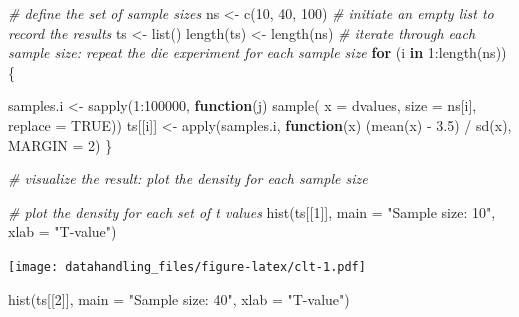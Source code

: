 \documentclass[
  12pt,
]{style/krantz}
\newenvironment{Shaded}{\begin{snugshade}}{\end{snugshade}}
\newcommand{\AttributeTok}[1]{\textcolor[rgb]{0.77,0.63,0.00}{#1}}
\newcommand{\CommentTok}[1]{\textcolor[rgb]{0.56,0.35,0.01}{\textit{#1}}}
\newcommand{\ConstantTok}[1]{\textcolor[rgb]{0.00,0.00,0.00}{#1}}
\newcommand{\ControlFlowTok}[1]{\textcolor[rgb]{0.13,0.29,0.53}{\textbf{#1}}}
\newcommand{\DecValTok}[1]{\textcolor[rgb]{0.00,0.00,0.81}{#1}}
\newcommand{\FloatTok}[1]{\textcolor[rgb]{0.00,0.00,0.81}{#1}}
\newcommand{\FunctionTok}[1]{\textcolor[rgb]{0.00,0.00,0.00}{#1}}
\newcommand{\NormalTok}[1]{#1}
\newcommand{\OtherTok}[1]{\textcolor[rgb]{0.56,0.35,0.01}{#1}}
\newcommand{\SpecialCharTok}[1]{\textcolor[rgb]{0.00,0.00,0.00}{#1}}
\newcommand{\StringTok}[1]{\textcolor[rgb]{0.31,0.60,0.02}{#1}}
\begin{document}
\begin{Shaded}
\begin{Highlighting}[]
\CommentTok{\# define the set of sample sizes}
\NormalTok{ns }\OtherTok{\textless{}{-}} \FunctionTok{c}\NormalTok{(}\DecValTok{10}\NormalTok{, }\DecValTok{40}\NormalTok{, }\DecValTok{100}\NormalTok{)}
\CommentTok{\# initiate an empty list to record the results}
\NormalTok{ts }\OtherTok{\textless{}{-}} \FunctionTok{list}\NormalTok{()}
\FunctionTok{length}\NormalTok{(ts) }\OtherTok{\textless{}{-}} \FunctionTok{length}\NormalTok{(ns)}
\CommentTok{\# iterate through each sample size: \textquotesingle{}repeat the die experiment for each sample size\textquotesingle{}}
\ControlFlowTok{for}\NormalTok{ (i }\ControlFlowTok{in} \DecValTok{1}\SpecialCharTok{:}\FunctionTok{length}\NormalTok{(ns)) \{}
     
\NormalTok{     samples.i }\OtherTok{\textless{}{-}} \FunctionTok{sapply}\NormalTok{(}\DecValTok{1}\SpecialCharTok{:}\DecValTok{100000}\NormalTok{, }\ControlFlowTok{function}\NormalTok{(j) }\FunctionTok{sample}\NormalTok{( }\AttributeTok{x =}\NormalTok{ dvalues,}
                                                       \AttributeTok{size =}\NormalTok{ ns[i],}
                                                       \AttributeTok{replace =} \ConstantTok{TRUE}\NormalTok{))}
\NormalTok{     ts[[i]] }\OtherTok{\textless{}{-}} \FunctionTok{apply}\NormalTok{(samples.i, }\ControlFlowTok{function}\NormalTok{(x) (}\FunctionTok{mean}\NormalTok{(x) }\SpecialCharTok{{-}} \FloatTok{3.5}\NormalTok{) }\SpecialCharTok{/} \FunctionTok{sd}\NormalTok{(x), }\AttributeTok{MARGIN =} \DecValTok{2}\NormalTok{)}
\NormalTok{\}}

\CommentTok{\# visualize the result: plot the density for each sample size}

\CommentTok{\# plot the density for each set of t values}
\FunctionTok{hist}\NormalTok{(ts[[}\DecValTok{1}\NormalTok{]], }\AttributeTok{main =} \StringTok{"Sample size: 10"}\NormalTok{, }\AttributeTok{xlab =} \StringTok{"T{-}value"}\NormalTok{)}
\end{Highlighting}
\end{Shaded}

\texttt{[image: datahandling\_files/figure-latex/clt-1.pdf]}

\begin{Shaded}
\begin{Highlighting}[]
\FunctionTok{hist}\NormalTok{(ts[[}\DecValTok{2}\NormalTok{]], }\AttributeTok{main =} \StringTok{"Sample size: 40"}\NormalTok{, }\AttributeTok{xlab =} \StringTok{"T{-}value"}\NormalTok{)}
\end{Highlighting}
\end{Shaded}
\end{document}
